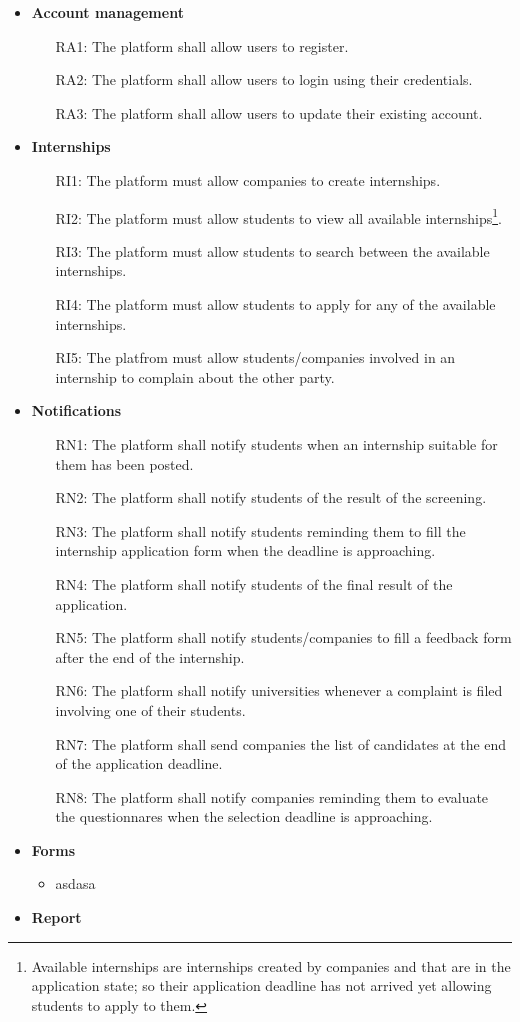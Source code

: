 \documentclass[11pt,twoside]{article}
\begin{document}
\begin{itemize}
\item \textbf{Account management}
\begin{itemize}
\item[RA1:] The platform shall allow users to register.
\item[RA2:] The platform shall allow users to login using their credentials.
\item[RA3:] The platform shall allow users to update their existing account.
\end{itemize}
\item \textbf{Internships}
\begin{itemize}
\item[RI1:] The platform must allow companies to create internships.
\item[RI2:] The platform must allow students to view all available internships\footnote{Available internships are internships created by companies and that are in the application state; so their application deadline has not arrived yet allowing students to apply to them.}.
\item[RI3:] The platform must allow students to search between the available internships.
\item[RI4:] The platform must allow students to apply for any of the available internships.
\item[RI5:] The platfrom must allow students/companies involved in an internship to complain about the other party.
\end{itemize}
\item \textbf{Notifications}
\begin{itemize}
\item[RN1:] The platform shall notify students when an internship suitable for them has been posted.
\item[RN2:] The platform shall notify students of the result of the screening.
\item[RN3:] The platform shall notify students reminding them to fill the internship application form when the deadline is approaching.
\item[RN4:] The platform shall notify students of the final result of the application.
\item[RN5:] The platform shall notify students/companies to fill a feedback form after the end of the internship.
\item[RN6:] The platform shall notify universities whenever a complaint is filed involving one of their students.
\item[RN7:] The platform shall send companies the list of candidates at the end of the application deadline.
\item[RN8:] The platform shall notify companies reminding them to evaluate the questionnares when the selection deadline is approaching.
\end{itemize}
\item \textbf{Forms}
\begin{itemize}
\item asdasa
\end{itemize}
\item \textbf{Report}
\end{itemize}
\end{document}
